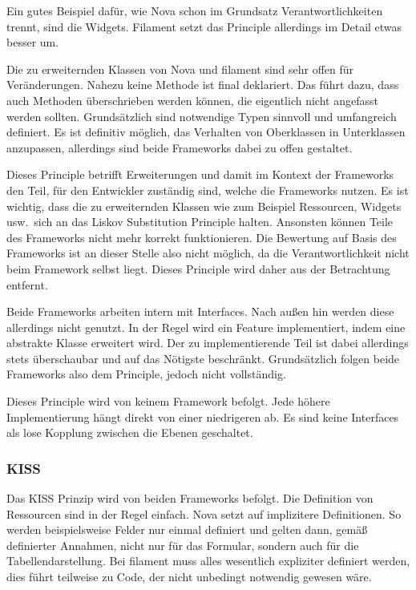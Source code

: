 Ein gutes Beispiel dafür, wie Nova schon im Grundsatz Verantwortlichkeiten trennt, sind die Widgets.
Filament setzt das Principle allerdings im Detail etwas besser um.

Die zu erweiternden Klassen von Nova und filament sind sehr offen für Veränderungen.
Nahezu keine Methode ist final deklariert.
Das führt dazu, dass auch Methoden überschrieben werden können, die eigentlich nicht angefasst werden sollten.
Grundsätzlich sind notwendige Typen sinnvoll und umfangreich definiert.
Es ist definitiv möglich, das Verhalten von Oberklassen in Unterklassen anzupassen, allerdings sind beide Frameworks dabei zu offen gestaltet.

Dieses Principle betrifft Erweiterungen und damit im Kontext der Frameworks den Teil, für den Entwickler zuständig sind, welche die Frameworks nutzen.
Es ist wichtig, dass die zu erweiternden Klassen wie zum Beispiel Ressourcen, Widgets usw.\ sich an das Liskov Substitution Principle halten.
Ansonsten können Teile des Frameworks nicht mehr korrekt funktionieren.
Die Bewertung auf Basis des Frameworks ist an dieser Stelle also nicht möglich, da die Verantwortlichkeit nicht beim Framework selbst liegt.
Dieses Principle wird daher aus der Betrachtung entfernt.

Beide Frameworks arbeiten intern mit Interfaces.
Nach außen hin werden diese allerdings nicht genutzt.
In der Regel wird ein Feature implementiert, indem eine abstrakte Klasse erweitert wird.
Der zu implementierende Teil ist dabei allerdings stets überschaubar und auf das Nötigste beschränkt.
Grundsätzlich folgen beide Frameworks also dem Principle, jedoch nicht vollständig.

Dieses Principle wird von keinem Framework befolgt.
Jede höhere Implementierung hängt direkt von einer niedrigeren ab.
Es sind keine Interfaces als lose Kopplung zwischen die Ebenen geschaltet.

\subsubsection{KISS}
Das KISS Prinzip wird von beiden Frameworks befolgt.
Die Definition von Ressourcen sind in der Regel einfach.
Nova setzt auf implizitere Definitionen.
So werden beispielsweise Felder nur einmal definiert und gelten dann, gemäß definierter Annahmen, nicht nur für das Formular, sondern auch für die Tabellendarstellung.
Bei filament muss alles wesentlich expliziter definiert werden, dies führt teilweise zu Code, der nicht unbedingt notwendig gewesen wäre.

